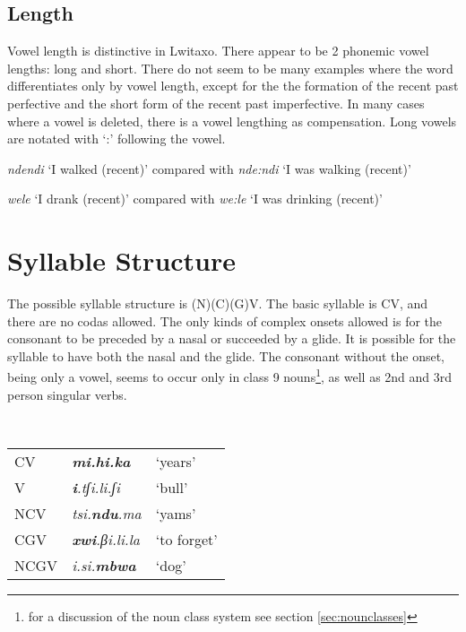 \subsection{Length}

Vowel length is distinctive in Lwitaxo.  There appear to be 2 phonemic vowel lengths: long and short.  There do not seem to be many examples where the word differentiates only by vowel length, except for the the formation of the recent past perfective and the short form of the recent past imperfective.  In many cases where a vowel is deleted, there is a vowel lengthing as compensation.  Long vowels are notated with `:' following the vowel.

\begin{wrdex}
\item \emph{nd\ezh{}endi} `I walked (recent)' compared with \emph{nd\ezh{}e:ndi} `I was walking (recent)'
\item \emph{\engma{}wele} `I drank (recent)' compared with \emph{\engma{}we:le} `I was drinking (recent)'
\end{wrdex}

\section{Syllable Structure}
The possible syllable structure is (N)(C)(G)V.  The basic syllable is CV, and there are no codas allowed.  The only kinds of complex onsets allowed is for the consonant to be preceded by a nasal or succeeded by a glide. It is possible for the syllable to have both the nasal and the glide. The consonant without the onset, being only a vowel, seems to occur only in class 9 nouns\footnote{for a discussion of the noun class system see section \ref{sec:nounclasses}}, as well as 2nd and 3rd person singular verbs.

\\
\begin{tabular}{lll}
\addlinespace
\toprule
CV    & {\it \textbf{mi.hi.ka}} & `years' \\
V     & {\it \textbf{i}.tʃi.li.ʃi} & `bull' \\
NCV   & {\it tsi.\textbf{ndu}.ma} & `yams' \\
CGV   & {\it \textbf{xwi}.βi.li.la} & `to forget' \\
NCGV  & {\it i.si.\textbf{mbwa}} & `dog' \\
\bottomrule
\end{tabular}

